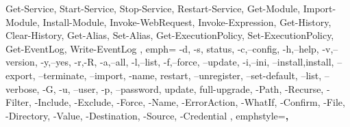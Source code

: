 {{		Get-Service, Start-Service, Stop-Service, Restart-Service,
		Get-Module, Import-Module, Install-Module,
		Invoke-WebRequest, Invoke-Expression,
		Get-History, Clear-History,
		Get-Alias, Set-Alias,
		Get-ExecutionPolicy, Set-ExecutionPolicy,
		Get-EventLog, Write-EventLog
	},
	emph={
		-d,
		-s, status,
		-c,--config,
		-h,--help,
		-v,--version,
		-y,--yes,
		-r,-R,
		-a,--all,
		-l,--list,
		-f,--force,
		--update,
		-i,--ini,
		--install,install,
		--export, --terminate,
		--import,
		-name,
		restart,
		--unregister,
		--set-default,
		--list,
		--verbose,
		-G,
		-u, --user,
		-p, --password,
		update, full-upgrade,
		-Path,
		-Recurse,
		-Filter,
		-Include,
		-Exclude,
		-Force,
		-Name,
		-ErrorAction,
		-WhatIf,
		-Confirm,
		-File,
		-Directory,
		-Value,
		-Destination,
		-Source,
		-Credential
	},
	emphstyle=\color{purple}\bfseries,
}


